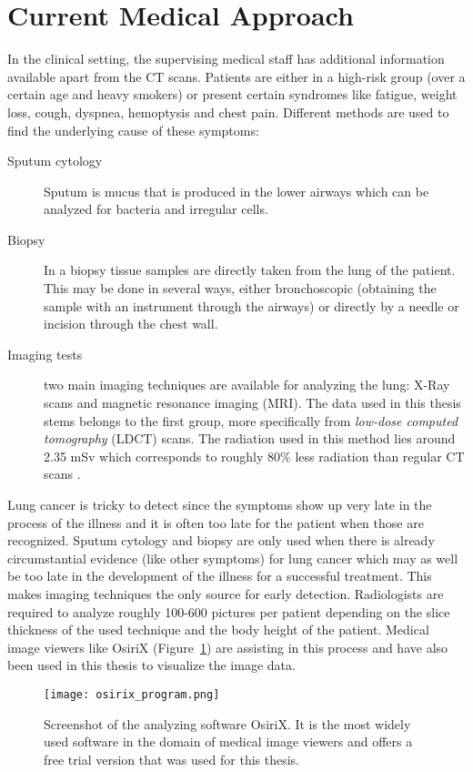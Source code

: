 \documentclass[main.tex]{subfiles}
\begin{document}
\section{Current Medical Approach}
In the clinical setting, the supervising medical staff has additional information available apart from the CT scans. Patients are either in a high-risk group (over a certain age and heavy smokers) or present certain syndromes like fatigue, weight loss, cough, dyspnea, hemoptysis and chest pain. Different methods are used to find the underlying cause of these symptoms:

\begin{description}
\item[Sputum cytology] Sputum is mucus that is produced in the lower airways which can be analyzed for bacteria and irregular cells.
\item[Biopsy] In a biopsy tissue samples are directly taken from the lung of the patient. This may be done in several ways, either bronchoscopic (obtaining the sample with an instrument through the airways) or directly by a needle or incision through the chest wall.
\item[Imaging tests] two main imaging techniques are available for analyzing the lung: X-Ray scans and magnetic resonance imaging (MRI). The data used in this thesis stems belongs to the first group, more specifically from \emph{low-dose computed tomography} (LDCT) scans. The radiation used in this method lies around 2.35 mSv which corresponds to roughly 80$\%$ less radiation than regular CT scans \cite{ono2013low}.
\end{description}

Lung cancer is tricky to detect since the symptoms show up very late in the process of the illness and it is often too late for the patient when those are recognized. Sputum cytology and biopsy are only used when there is already circumstantial evidence (like other symptoms) for lung cancer which may as well be too late in the development of the illness for a successful treatment. This makes imaging techniques the only source for early detection. Radiologists are required to analyze roughly 100-600 pictures per patient depending on the slice thickness of the used technique and the body height of the patient. Medical image viewers like OsiriX (Figure~\ref{fig:osirix}) are assisting in this process and have also been used in this thesis to visualize the image data.

\begin{figure}[ht]
\texttt{[image: osirix\_program.png]}
\caption{Screenshot of the analyzing software OsiriX. It is the most widely used software in the domain of medical image viewers and offers a free trial version that was used for this thesis.}
\label{fig:osirix}
\end{figure}
\end{document}
